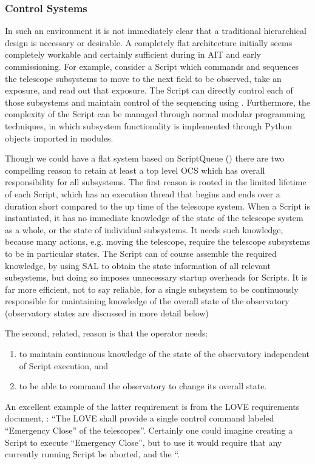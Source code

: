 \subsubsection{Control Systems} \label{sect:ocs}
In such an environment it is not immediately clear that a traditional hierarchical design is necessary or desirable. A completely flat architecture initially seems completely workable and certainly sufficient during in AIT and early commissioning. For example, consider a Script which commands and sequences the telescope subsystems to move to the next field to be observed, take an exposure, and read out that exposure. The Script can directly control each of those subsystems and maintain control of the sequencing using \asyncio. Furthermore, the complexity of the Script can be managed through normal modular programming techniques, in which subsystem functionality is implemented through Python objects imported in modules.

Though we could have a flat system based on ScriptQueue ()
there are two compelling reason to retain at least a top level OCS which has
overall responsibility for all subsystems. The first reason is rooted in the limited lifetime of each
Script, which has an execution thread that begins and ends over a duration short compared to
the up time of the telescope system. When a Script is instantiated, it has no immediate
knowledge of the state of the telescope system as a whole, or the state of individual
subsystems. It needs such knowledge, because many actions, e.g. moving the telescope,
require the telescope subsystems to be in particular states. The Script can of course assemble
the required knowledge, by using SAL to obtain the state information of all relevant subsystems,
but doing so imposes unnecessary startup overheads for Scripts. It is far more efficient, not to
say reliable, for a single subsystem to be continuously responsible for maintaining knowledge of
the overall state of the observatory (observatory states are discussed in more detail below)

The second, related, reason is that the operator needs:
\begin{enumerate}
\item to maintain continuous knowledge of
the state of the observatory independent of Script execution, and
\item  to be able to command the
observatory to change its overall state.
\end{enumerate}
An excellent example of the latter requirement is from
the LOVE requirements document, : “The LOVE shall provide a single control
command labeled “Emergency Close” of the telescopes”. Certainly one could imagine creating
a Script to execute “Emergency Close”, but to use it would require that any currently running
Script be aborted, and the “.


